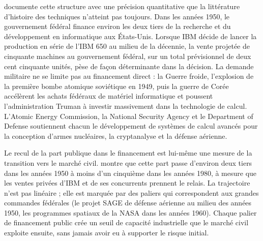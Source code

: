 %
\textcite{flamm_creating_1988} documente cette structure avec une précision quantitative que la littérature d'histoire des techniques n'atteint pas toujours. Dans les années 1950, le gouvernement fédéral finance environ les deux tiers de la recherche et du développement en informatique aux États-Unis. Lorsque IBM décide de lancer la production en série de l'IBM 650 au milieu de la décennie, la vente projetée de cinquante machines au gouvernement fédéral, sur un total prévisionnel de deux cent cinquante unités, pèse de façon déterminante dans la décision. La demande militaire ne se limite pas au financement direct : la Guerre froide, l'explosion de la première bombe atomique soviétique en 1949, puis la guerre de Corée accélèrent les achats fédéraux de matériel informatique et poussent l'administration Truman à investir massivement dans la technologie de calcul. L'Atomic Energy Commission, la National Security Agency et le Department of Defense soutiennent chacun le développement de systèmes de calcul avancés pour la conception d'armes nucléaires, la cryptanalyse et la défense aérienne.

Le recul de la part publique dans le financement est lui-même une mesure de la transition vers le marché civil. \textcite{flamm_targeting_1987} montre que cette part passe d'environ deux tiers dans les années 1950 à moins d'un cinquième dans les années 1980, à mesure que les ventes privées d'IBM et de ses concurrents prennent le relais. La trajectoire n'est pas linéaire ; elle est marquée par des paliers qui correspondent aux grandes commandes fédérales (le projet SAGE de défense aérienne au milieu des années 1950, les programmes spatiaux de la NASA dans les années 1960). Chaque palier de financement public crée un seuil de capacité industrielle que le marché civil exploite ensuite, sans jamais avoir eu à supporter le risque initial.


